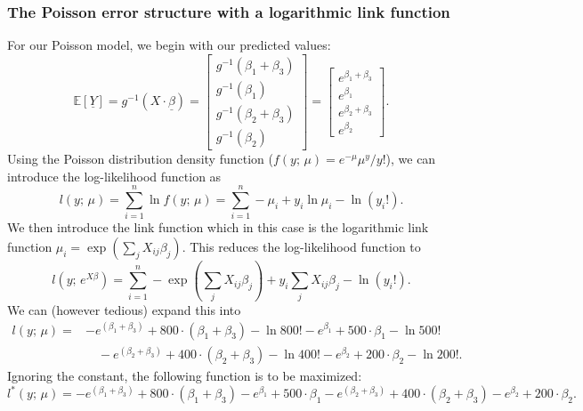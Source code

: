 \documentclass{article}
\begin{document}
\subsubsection{The Poisson error structure with a logarithmic link function}
For our Poisson model, we begin with our predicted values:
\begin{equation}
    \mathbb{E}[\underline{Y}] = g^{-1}(X\cdot \underline{\beta}) = \begin{bmatrix} g^{-1}(\beta_1 + \beta_3) \\ g^{-1}(\beta_1) \\ g^{-1}(\beta_2 + \beta_3) \\ g^{-1}(\beta_2) \end{bmatrix} = \begin{bmatrix} e^{\beta_1 + \beta_3} \\ e^{\beta_1} \\ e^{\beta_2 + \beta_3} \\ e^{\beta_2} \end{bmatrix}.
\end{equation}
Using the Poisson distribution density function  ($f(y;\,\mu)=e^{-\mu}\mu^y/y!$), we can introduce the log-likelihood function as
\begin{equation}
    l(y;\,\mu) = \sum_{i=1}^n \ln f(y;\,\mu) = \sum_{i=1}^n-\mu_i + y_i\ln\mu_i-\ln(y_i!).
\end{equation}
We then introduce the link function which in this case is the logarithmic link function $\mu_i = \exp{(\sum_j X_{ij}\beta_j)}$. This reduces the log-likelihood function to
\begin{equation}
    l(y;\,e^{X\beta}) = \sum_{i=1}^n-\exp{(\sum_j X_{ij}\beta_j)} + y_i\sum_j X_{ij}\beta_j-\ln(y_i!).
\end{equation}
We can (however tedious) expand this into
\begin{align}
    l(y;\,\mu) = &-e^{(\beta_1+\beta_3)}+800\cdot(\beta_1+\beta_3)-\ln{800!}-e^{\beta_1} + 500\cdot\beta_1 - \ln{500!} \nonumber \\ &\quad- e^{(\beta_2+\beta_3)}+400\cdot (\beta_2+\beta_3)-\ln{400!} - e^{\beta_2}+200\cdot{\beta_2}-\ln{200!}.
\end{align}
Ignoring the constant, the following function is to be maximized:
\begin{equation}
    l^*(y;\,\mu) = -e^{(\beta_1+\beta_3)}+800\cdot(\beta_1+\beta_3)-e^{\beta_1} + 500\cdot\beta_1- e^{(\beta_2+\beta_3)}+400\cdot (\beta_2+\beta_3) - e^{\beta_2}+200\cdot{\beta_2}.
\end{equation}
\end{document}
